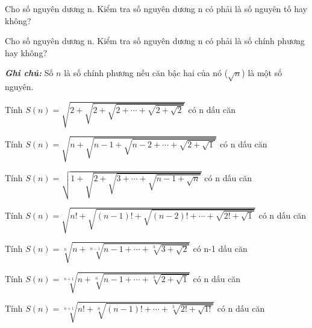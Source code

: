 \begin{problem}
    Cho số nguyên dương n. Kiểm tra số nguyên dương n có phải là số nguyên tố hay không?
\end{problem}

\begin{problem}
    Cho số nguyên dương n. Kiểm tra số nguyên dương n có phải là số chính phương hay không?

    \textbf{\textit{Ghi chú:}} Số $n$ là số chính phương nếu căn bậc hai của nó ($\sqrt{n}$) là một số nguyên.
\end{problem}

\begin{problem}
    Tính $S(n) = \sqrt{2 + \sqrt{2 + \sqrt{2+ \cdots + \sqrt{2 + \sqrt{2}}}}}$ có n dấu căn
\end{problem}

\begin{problem}
    Tính $S(n) = \sqrt{n + \sqrt{n - 1 + \sqrt{n - 2 + \cdots + \sqrt{2 + \sqrt{1}}}}}$ có n dấu căn
\end{problem}

\begin{problem}
    Tính $S(n) = \sqrt{1 + \sqrt{2 + \sqrt{3+ \cdots + \sqrt{n - 1 + \sqrt{n}}}}}$ có n dấu căn
\end{problem}

\begin{problem}
    Tính $S(n) = \sqrt{n! + \sqrt{(n-1)! + \sqrt{(n-2)! + \cdots + \sqrt{2! + \sqrt{1}}}}}$ có n dấu căn
\end{problem}

\begin{problem}
    Tính $S(n) = \sqrt[n]{n + \sqrt[n-1]{n-1 + \cdots + \sqrt[3]{3 + \sqrt{2}}}}$ có n-1 dấu căn
\end{problem}

\begin{problem}
    Tính $S(n) = \sqrt[n+1]{n + \sqrt[n]{n - 1 + \cdots + \sqrt[3]{2 + \sqrt{1}}}}$ có n dấu căn
\end{problem}

\begin{problem}
    Tính $S(n) = \sqrt[n+1]{n! + \sqrt[n]{(n - 1)! + \cdots + \sqrt[3]{2! + \sqrt{1!}}}}$ có n dấu căn
\end{problem}

